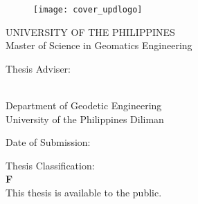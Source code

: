 

\setcounter{page}{1}

\newpage
\thispagestyle{empty}
\begin{center}

	\begin{figure}
	\centering
	\texttt{[image: cover\_updlogo]}
	\label{fig: cover-uplogo}
	\end{figure}

  	{UNIVERSITY OF THE PHILIPPINES\\[0.5cm]
	 Master of Science in Geomatics Engineering}
  	 \vspace*{1cm}
  
  	{\textbf \authorname}
  	 \vspace*{0.2cm}
  
  	\begin{singlespace}
  		{\thesistitle}
  	\end{singlespace}  
  
  	\vspace*{0.5cm}

	{Thesis Adviser:}\\[0.5cm]
	 \begin{singlespace}
  	 	\textbf \advisername\\
  	 	{Department of Geodetic Engineering\\
  	 	University of the Philippines Diliman}
  	 \end{singlespace}
  	 \vspace*{1cm}

  	{Date of Submission:\\ 
  	 \thesismonthyear}
  	 \vspace*{1cm}
  	
  	{Thesis Classification:\\ 
  	 \textbf{F}\\
  	 This thesis is available to the public.}
  	 \vspace*{1cm}  

\end{center}


\newpage
\thispagestyle{empty}

